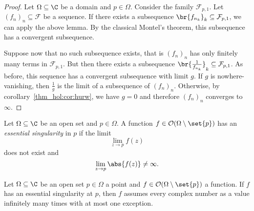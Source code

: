 \begin{proof}
Let $\Omega \subseteq \C$ be a domain and $p \in \Omega$. Consider
the family $\mathcal{F}_{p,1}$. Let $(f_n)_n \subseteq \mathcal{F}$
be a sequence. If there exists a subsequence
$\br{f_{n_k}}_k \subseteq \mathcal{F}_{p,1}$, we can apply the
above lemma. By the classical Montel's theorem, this subsequence
has a convergent subsequence.

Suppose now that no such subsequence exists, that is $(f_n)_n$ has
only finitely many terms in $\mathcal{F}_{p,1}$. But then there
exists a subsequence
$\br{\frac{1}{f_{n_k}}}_k \subseteq \mathcal{F}_{p,1}$. As before,
this sequence has a convergent subsequence with limit $g$. If $g$
is nowhere-vanishing, then $\frac{1}{g}$ is the limit of a
subsequence of $(f_n)_n$. Otherwise, by
corollary~\ref{thm_hol:cor:hurw}, we have $g = 0$ and therefore
$(f_n)_n$ converges to $\infty$.
\end{proof}

\begin{definicija}
Let $\Omega \subseteq \C$ be an open set and $p \in \Omega$. A
function $f \in \mathcal{O}(\Omega \setminus \set{p})$ has an
\emph{essential singularity} in $p$ if
the limit
\[
\lim_{z \to p} f(z)
\]
does not exist and
\[
\lim_{z \to p} \abs{f(z)} \ne \infty.
\]
\end{definicija}

\begin{izrek}
Let $\Omega \subseteq \C$ be an open set $p \in \Omega$ a point and
$f \in \mathcal{O}(\Omega \setminus \set{p})$ a function. If $f$
has an essential singularity at $p$, then $f$ assumes every complex
number as a value infinitely many times with at most one exception.
\end{izrek}

